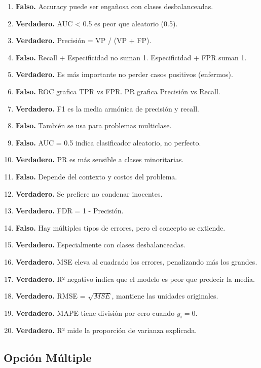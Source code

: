 \documentclass[12pt]{article}
\begin{document}
\begin{enumerate}
    \item \textbf{Falso.} Accuracy puede ser engañosa con clases desbalanceadas.
    \item \textbf{Verdadero.} AUC < 0.5 es peor que aleatorio (0.5).
    \item \textbf{Verdadero.} Precisión = VP / (VP + FP).
    \item \textbf{Falso.} Recall + Especificidad no suman 1. Especificidad + FPR suman 1.
    \item \textbf{Verdadero.} Es más importante no perder casos positivos (enfermos).
    \item \textbf{Falso.} ROC grafica TPR vs FPR. PR grafica Precisión vs Recall.
    \item \textbf{Verdadero.} F1 es la media armónica de precisión y recall.
    \item \textbf{Falso.} También se usa para problemas multiclase.
    \item \textbf{Falso.} AUC = 0.5 indica clasificador aleatorio, no perfecto.
    \item \textbf{Verdadero.} PR es más sensible a clases minoritarias.
    \item \textbf{Falso.} Depende del contexto y costos del problema.
    \item \textbf{Verdadero.} Se prefiere no condenar inocentes.
    \item \textbf{Verdadero.} FDR = 1 - Precisión.
    \item \textbf{Falso.} Hay múltiples tipos de errores, pero el concepto se extiende.
    \item \textbf{Verdadero.} Especialmente con clases desbalanceadas.
    \item \textbf{Verdadero.} MSE eleva al cuadrado los errores, penalizando más los grandes.
    \item \textbf{Verdadero.} R² negativo indica que el modelo es peor que predecir la media.
    \item \textbf{Verdadero.} RMSE = $\sqrt{MSE}$, mantiene las unidades originales.
    \item \textbf{Verdadero.} MAPE tiene división por cero cuando $y_i = 0$.
    \item \textbf{Verdadero.} R² mide la proporción de varianza explicada.
\end{enumerate}

\subsection{Opción Múltiple}
\end{document}

